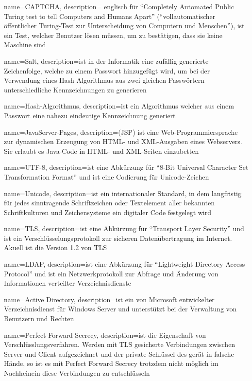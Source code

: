 {
	name=CAPTCHA,
	description={
		englisch für "`Completely Automated Public Turing test to tell Computers and Humans Apart"' ("`vollautomatischer öffentlicher Turing-Test zur Unterscheidung von Computern und Menschen"'), ist ein Test, welcher Benutzer lösen müssen, um zu bestätigen, dass sie keine Maschine sind
	}
}



{
	name=Salt,
	description={ist in der Informatik eine zufällig generierte Zeichenfolge, welche zu einem Passwort  hinzugefügt wird, um bei der Verwendung eines Hash-Algorithmus aus zwei gleichen Passwörtern unterschiedliche Kennzeichnungen zu generieren}
}

{
	name={Hash-Algorithmus},
	description={ist ein Algorithmus welcher aus einem Passwort eine nahezu eindeutige Kennzeichnung generiert}
}

{
	name={JavaServer-Pages},
	description={(JSP) ist eine Web-Programmiersprache zur dynamischen Erzeugung von HTML- und XML-Ausgaben eines Webservers. Sie erlaubt es Java-Code in HTML- und XML-Seiten einzubetten}
}

{
	name={UTF-8},
	description={ist eine Abkürzung für "`8-Bit Universal Character Set Transformation Format"' und ist eine Codierung für \gls{Unicode}-Zeichen}
}

{
	name={Unicode},
	description={ist ein internationaler Standard, in dem langfristig für jedes sinntragende Schriftzeichen oder Textelement aller bekannten Schriftkulturen und Zeichensysteme ein digitaler Code festgelegt wird}
}

{
	name={TLS},
	description={ist eine Abkürzung für "`Transport Layer Security"' und ist ein Verschlüsselungsprotokoll zur sicheren Datenübertragung im Internet. Akuell ist die Version 1.2 von \gls{TLS}\cite{rfc5246}}
}

{
	name={LDAP},
	description={ist eine Abkürzung für "`Lightweight Directory Access Protocol"' und  ist ein Netzwerkprotokoll zur Abfrage und Änderung von Informationen verteilter Verzeichnisdienste}
}

{
	name={Active Directory},
	description={ist ein von Microsoft entwickelter Verzeichnisdienst für Windows Server und unterstützt bei der Verwaltung von Benutzern und Rechten}
}

{
	name={Perfect Forward Secrecy},
	description={ist die Eigenschaft von Verschlüsslungsverfahren. Werden mit \gls{TLS} gesicherte Verbindungen zwischen Server und Client aufgezeichnet und der private Schlüssel des gerät in falsche Hände, so ist es mit Perfect Forward Secrecy trotzdem nicht möglich im Nachheinein diese Verbindungen zu entschlüsseln \cite{yanzhu14whytheweb}}
}